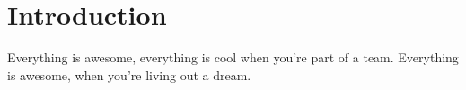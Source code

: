 \chapter{Introduction}
\label{toc:introduction}
Everything is awesome, everything is cool when you're part of a team.
Everything is awesome, when you're living out a dream.
